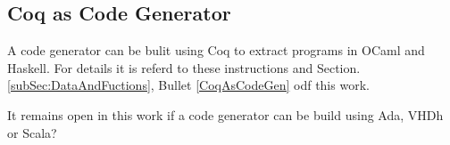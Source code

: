 \subsection{Coq as Code Generator}
\label{subsec:coqAsACodeGenerator}

A code generator can be bulit using Coq to extract programs in OCaml and Haskell. For details it is referd to these instructions \cite{ExtractingProgrammsinOCAMlandHaskell} and Section. \ref{subSec:DataAndFuctions}, Bullet \ref{CoqAsCodeGen} odf this work.

It remains open in this work if a code generator can be build using Ada, VHDh or Scala? 


% 
% 
